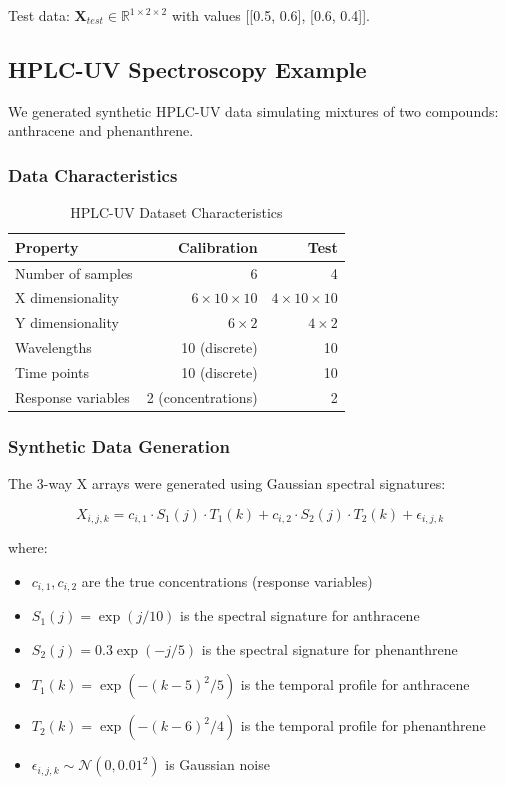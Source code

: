 \documentclass[12pt,a4paper]{article}
\begin{document}
Test data: $\mathbf{X}_{test} \in \mathbb{R}^{1 \times 2 \times 2}$ with values [[0.5, 0.6], [0.6, 0.4]].

\subsection{HPLC-UV Spectroscopy Example}

We generated synthetic HPLC-UV data simulating mixtures of two compounds: anthracene and phenanthrene.

\subsubsection{Data Characteristics}

\begin{table}[H]
\centering
\caption{HPLC-UV Dataset Characteristics}
\begin{tabular}{lrr}
\toprule
\textbf{Property} & \textbf{Calibration} & \textbf{Test} \\
\midrule
Number of samples & 6 & 4 \\
X dimensionality & $6 \times 10 \times 10$ & $4 \times 10 \times 10$ \\
Y dimensionality & $6 \times 2$ & $4 \times 2$ \\
Wavelengths & 10 (discrete) & 10 \\
Time points & 10 (discrete) & 10 \\
Response variables & 2 (concentrations) & 2 \\
\bottomrule
\end{tabular}
\end{table}

\subsubsection{Synthetic Data Generation}

The 3-way X arrays were generated using Gaussian spectral signatures:

$$X_{i,j,k} = c_{i,1} \cdot S_1(j) \cdot T_1(k) + c_{i,2} \cdot S_2(j) \cdot T_2(k) + \epsilon_{i,j,k}$$

where:
\begin{itemize}
    \item $c_{i,1}, c_{i,2}$ are the true concentrations (response variables)
    \item $S_1(j) = \exp(j/10)$ is the spectral signature for anthracene
    \item $S_2(j) = 0.3 \exp(-j/5)$ is the spectral signature for phenanthrene
    \item $T_1(k) = \exp(-(k-5)^2/5)$ is the temporal profile for anthracene
    \item $T_2(k) = \exp(-(k-6)^2/4)$ is the temporal profile for phenanthrene
    \item $\epsilon_{i,j,k} \sim \mathcal{N}(0, 0.01^2)$ is Gaussian noise
\end{itemize}
\end{document}
